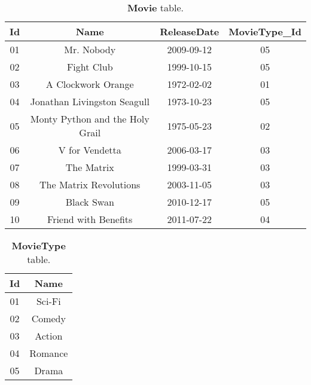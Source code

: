 	\begin{table}[H]
		\begin{center}
			\begin{tabular}{|c|c|c|c|}
				\hline
				\textbf{Id} & \textbf{Name} & \textbf{ReleaseDate} & \textbf{MovieType\_Id} \\ \hline
				01 & Mr. Nobody & 2009-09-12 & 05 \\ \hline
				02 & Fight Club & 1999-10-15 & 05 \\ \hline
				03 & A Clockwork Orange & 1972-02-02 & 01 \\ \hline
				04 & Jonathan Livingston Seagull & 1973-10-23 & 05 \\ \hline
				05 & Monty Python and the Holy Grail & 1975-05-23 & 02 \\ \hline
				06 & V for Vendetta & 2006-03-17 & 03 \\ \hline
				07 & The Matrix & 1999-03-31 & 03 \\ \hline
				08 & The Matrix Revolutions & 2003-11-05 & 03 \\ \hline
				09 & Black Swan & 2010-12-17 & 05 \\ \hline
				10 & Friend with Benefits & 2011-07-22 & 04 \\ \hline
			\end{tabular}
			\caption{\textbf{Movie} table.}
		\end{center}
	\end{table}

	\begin{table}[H]
		\begin{center}
			\begin{tabular}{|c|c|}
				\hline
				\textbf{Id} & \textbf{Name} \\ \hline
				01 & Sci-Fi \\ \hline
				02 & Comedy \\ \hline
				03 & Action \\ \hline
				04 & Romance \\ \hline
				05 & Drama \\ \hline
			\end{tabular}
			\caption{\textbf{MovieType} table.}
		\end{center}
	\end{table}

